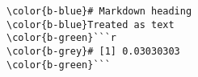 \documentclass[class=minimal,border=0]{standalone}
\begin{document}
%
\begin{BVerbatim}[bgcolor=b-darkgrey]
\color{b-blue}# Markdown heading
\color{b-blue}Treated as text
\color{b-green}```r
\color{b-grey}# [1] 0.03030303
\color{b-green}```
\end{BVerbatim}
\end{document}
